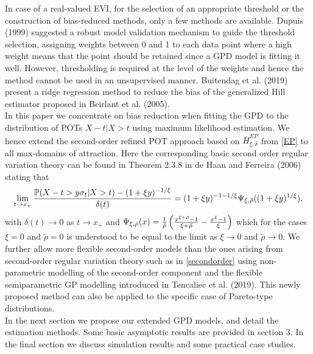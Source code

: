 \documentclass[twoside,leqno,11pt]{article}
\begin{document}
In case of a real-valued EVI, for the selection of an appropriate threshold or the construction of bias-reduced methods, only a few methods are available. Dupuis (1999) suggested a robust model validation mechanism  to guide the threshold selection, assigning weights between 0 and 1 to each data point where a high weight means that the point should be retained since a GPD model is fitting it well. However, thresholding is required at the level of the weights and hence the method cannot be used in an unsupervised manner. Buitendag et al. (2019) present a ridge regression method to reduce the bias of the generalized Hill estimator proposed in Beirlant et al. (2005). \\

In this paper we concentrate on bias reduction when fitting the GPD  to the distribution of POTs $X-t|X>t$ using maximum likelihood estimation. 
We hence extend the second-order refined POT approach based on $\bar{H}^{EP}_{\xi,\delta}$ from \eqref{EP}  to all max-domains of attraction.
Here the corresponding basic second order regular variation theory can be found in 
Theorem 2.3.8 in de Haan and Ferreira (2006) stating that
 \begin{equation}
 \lim_{t \to x_+}{ \mathbb{P}(X-t >y\sigma_t|X>t)- (1+\xi y)^{-1/\xi} \over \delta (t)} = (1+\xi y)^{-1-1/\xi}\Psi_{\xi,\tilde{\rho}}((1+\xi y)^{1/\xi}),
 \label{secondorder}
 \end{equation}
 with $\delta(t) \to 0$ as $t \to x_+$ and $\Psi_{\xi,\tilde{\rho}}(x)={1 \over \tilde\rho}\left({x^{\xi +\tilde{\rho}}-1 \over \xi +\tilde\rho}- {x^{\xi}-1 \over \xi}\right)$ which for the cases $\xi=0$ and $\tilde\rho=0$ is understood to be equal to the limit as $\xi \to 0$ and $\tilde\rho \to 0$.
We further allow more flexible second-order models than the ones arising from second-order regular variation theory such as in \eqref{secondorder} using non-parametric  modelling of the second-order component and the flexible semiparametric GP modelling introduced in Tencaliec et al. (2019). This  newly proposed method can  also  be applied to the specific case of Pareto-type distributions. 
\\

 In the next section we propose our extended GPD models, and detail the estimation methods. Some basic asymptotic results are provided in section 3. In the final  section we discuss simulation results  and some practical case studies. 
\end{document}

